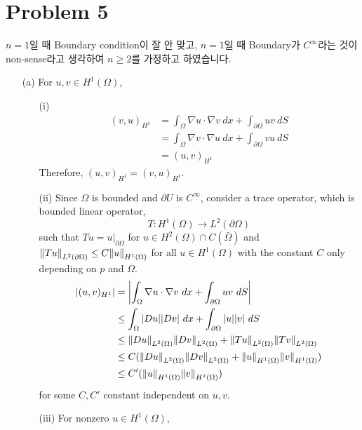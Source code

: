 \documentclass{article}
\begin{document}
\section*{Problem 5}
$n=1$일 때 Boundary condition이 잘 안 맞고, $n=1$일 때 Boundary가 $C^\infty$라는 것이 non-sense라고 생각하여 $n\geq 2$를 가정하고 하였습니다.
\begin{enumerate}
\item[(a)] For $u,v\in H^1(\Omega)$,
\begin{enumerate}
\item[(i)]
\begin{equation*}
\begin{split}
(v,u)_{H^1}&=\int_\Omega \nabla u\cdot \nabla v~dx+\int_{\partial \Omega} uv~dS\\
&=\int_\Omega \nabla v\cdot \nabla u~dx+\int_{\partial \Omega} vu~dS \\
&=(u,v)_{H^1}
\end{split}
\end{equation*}
Therefore, $(u,v)_{H^1}=(v,u)_{H^1}$.
\item[(ii)] Since $\Omega$ is bounded and $\partial U$ is $C^\infty$, consider a trace operator, which is bounded linear operator,
\begin{equation*}
T:H^1(\Omega)\rightarrow L^2(\partial \Omega)
\end{equation*}
such that $Tu=u|_{\partial \Omega}$ for $u\in H^2(\Omega)\cap C(\bar{\Omega})$ and $\norm{Tu}_{L^2(\partial\Omega)}\leq C\norm{u}_{H^1(\Omega)}$ for all $u\in H^1(\Omega)$ with the constant $C$ only depending on $p$ and $\Omega$.
\begin{equation*}
\begin{split}
\abs{(u,v)_{H^1}}&=\abs{\int_\Omega \nabla u\cdot \nabla v~dx+\int_{\partial \Omega} uv~dS} \\
&\leq \int_\Omega \abs{Du}\abs{Dv}~dx+\int_{\partial \Omega} \abs{u}\abs{v}~dS \\
&\leq \norm{Du}_{L^2(\Omega)}\norm{Dv}_{L^2(\Omega)}+\norm{Tu}_{L^2(\Omega)}\norm{Tv}_{L^2(\Omega)}\\
&\leq C(\norm{Du}_{L^2(\Omega)}\norm{Dv}_{L^2(\Omega)}+\norm{u}_{H^1(\Omega)}\norm{v}_{H^1(\Omega)}) \\
&\leq C'(\norm{u}_{H^1(\Omega)}\norm{v}_{H^1(\Omega)})
\end{split}
\end{equation*}
for some $C, C'$ constant independent on $u,v$.
\item[(iii)] For nonzero $u\in H^1(\Omega)$,
\begin{equation*}

\end{equation*}
\end{enumerate}
\end{enumerate}
\end{document}
